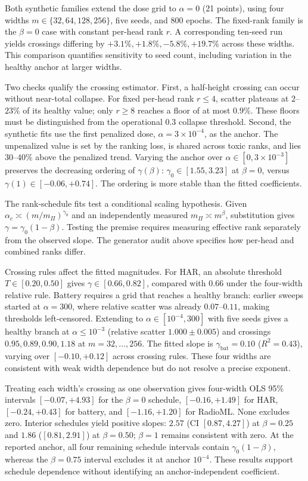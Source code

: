 \documentclass{article}
\begin{document}
Both synthetic families extend the dose grid to $\alpha=0$ (21 points), using four widths $m\in\{32,64,128,256\}$, five seeds, and 800 epochs. The fixed-rank family is the $\beta=0$ case with constant per-head rank $r$. A corresponding ten-seed run yields crossings differing by $+3.1\%,+1.8\%,-5.8\%,+19.7\%$ across these widths. This comparison quantifies sensitivity to seed count, including variation in the healthy anchor at larger widths.

Two checks qualify the crossing estimator. First, a half-height crossing can occur without near-total collapse. For fixed per-head rank $r\le4$, scatter plateaus at $2$--$23\%$ of its healthy value; only $r\ge8$ reaches a floor of at most $0.9\%$. These floors must be distinguished from the operational $0.3$ collapse threshold. Second, the synthetic fits use the first penalized dose, $\alpha=3\times10^{-4}$, as the anchor. The unpenalized value is set by the ranking loss, is shared across toxic ranks, and lies $30$--$40\%$ above the penalized trend. Varying the anchor over $\alpha\in[0,3\times10^{-3}]$ preserves the decreasing ordering of $\gamma(\beta)$: $\gamma_0\in[1.55,3.23]$ at $\beta=0$, versus $\gamma(1)\in[-0.06,+0.74]$. The ordering is more stable than the fitted coefficients.

The rank-schedule fits test a conditional scaling hypothesis. Given $\alpha_c\asymp(m/m_\Pi)^{\gamma_0}$ and an independently measured $m_\Pi\asymp m^\beta$, substitution gives $\gamma=\gamma_0(1-\beta)$. Testing the premise requires measuring effective rank separately from the observed slope. The generator audit above specifies how per-head and combined ranks differ.

Crossing rules affect the fitted magnitudes. For HAR, an absolute threshold $T\in[0.20,0.50]$ gives $\gamma\in[0.66,0.82]$, compared with $0.66$ under the four-width relative rule. Battery requires a grid that reaches a healthy branch: earlier sweeps started at $\alpha=300$, where relative scatter was already $0.07$--$0.11$, making thresholds left-censored. Extending to $\alpha\in[10^{-4},300]$ with five seeds gives a healthy branch at $\alpha\le10^{-3}$ (relative scatter $1.000\pm0.005$) and crossings $0.95,0.89,0.90,1.18$ at $m=32,\dots,256$. The fitted slope is $\gamma_{\mathrm{bat}}=0.10$ ($R^2=0.43$), varying over $[-0.10,+0.12]$ across crossing rules. These four widths are consistent with weak width dependence but do not resolve a precise exponent.

Treating each width's crossing as one observation gives four-width OLS 95\% intervals $[-0.07,+4.93]$ for the $\beta=0$ schedule, $[-0.16,+1.49]$ for HAR, $[-0.24,+0.43]$ for battery, and $[-1.16,+1.20]$ for RadioML. None excludes zero. Interior schedules yield positive slopes: $2.57$ (CI $[0.87,4.27]$) at $\beta=0.25$ and $1.86$ ($[0.81,2.91]$) at $\beta=0.50$; $\beta=1$ remains consistent with zero. At the reported anchor, all four remaining schedule intervals contain $\gamma_0(1-\beta)$, whereas the $\beta=0.75$ interval excludes it at anchor $10^{-4}$. These results support schedule dependence without identifying an anchor-independent coefficient.
\end{document}
